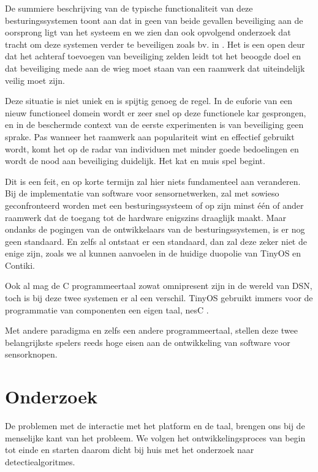 De summiere beschrijving van de typische functionaliteit van deze
besturingssystemen toont aan dat in geen van beide gevallen beveiliging aan de
oorsprong ligt van het systeem en we zien dan ook opvolgend onderzoek dat
tracht om deze systemen verder te beveiligen zoals bv. in \citep{paul2009safe,
casado2009contikisec, karlof2004tinysec}. Het is een open deur dat het achteraf
toevoegen van beveiliging zelden leidt tot het beoogde doel en dat beveiliging
mede aan de wieg moet staan van een raamwerk dat uiteindelijk veilig moet zijn.

Deze situatie is niet uniek en is spijtig genoeg de regel. In de euforie van
een nieuw functioneel domein wordt er zeer snel op deze functionele kar
gesprongen, en in de beschermde context van de eerste experimenten is van
beveiliging geen sprake. Pas wanneer het raamwerk aan populariteit wint en
effectief gebruikt wordt, komt het op de radar van individuen met minder goede
bedoelingen en wordt de nood aan beveiliging duidelijk. Het kat en muis spel
begint.

Dit is een feit, en op korte termijn zal hier niets fundamenteel aan
veranderen. Bij de implementatie van software voor sensornetwerken, zal met
sowieso geconfronteerd worden met een besturingssysteem of op zijn minst
\'e\'en of ander raamwerk dat de toegang tot de hardware enigszins draaglijk
maakt. Maar ondanks de pogingen van de ontwikkelaars van de besturingssystemen,
is er nog geen standaard. En zelfs al ontstaat er een standaard, dan zal deze
zeker niet de enige zijn, zoals we al kunnen aanvoelen in de huidige duopolie
van TinyOS en Contiki.

Ook al mag de C programmeertaal zowat omnipresent zijn in de wereld van DSN,
toch is bij deze twee systemen er al een verschil. TinyOS gebruikt immers voor
de programmatie van componenten een eigen taal, nesC \citep{gay2003nesc}.

Met andere paradigma en zelfs een andere programmeertaal, stellen deze twee
belangrijkste spelers reeds hoge eisen aan de ontwikkeling van software voor
sensorknopen.

\section{Onderzoek}
\label{section:problem-research}

De problemen met de interactie met het platform en de taal, brengen ons bij de
menselijke kant van het probleem. We volgen het ontwikkelingsproces van begin
tot einde en starten daarom dicht bij huis met het onderzoek naar
detectiealgoritmes.

